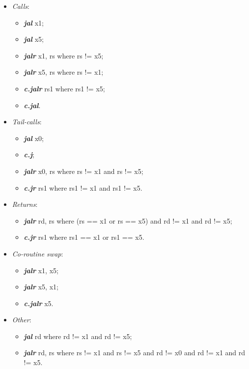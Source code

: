 \begin{itemize}
  \item \textit{Calls}: 
    \begin{itemize}
      \item \textbf{\textit{jal}} x1;
      \item \textbf{\textit{jal}} x5;
      \item \textbf{\textit{jalr}} x1, rs  where rs != x5;
      \item \textbf{\textit{jalr}} x5, rs  where rs != x1;
      \item \textbf{\textit{c.jalr}} rs1 where rs1 != x5;
      \item \textbf{\textit{c.jal}}.
    \end{itemize}
  \item \textit{Tail-calls}: 
    \begin{itemize}
      \item \textbf{\textit{jal}} x0;
      \item \textbf{\textit{c.j}};
      \item \textbf{\textit{jalr}} x0, rs where rs != x1 and rs != x5;
      \item \textbf{\textit{c.jr}} rs1 where rs1 != x1 and rs1 != x5.
    \end{itemize}
  \item \textit{Returns}: 
    \begin{itemize}
      \item \textbf{\textit{jalr}} rd, rs where (rs == x1 or rs == x5) and rd != x1 and rd != x5;
      \item \textbf{\textit{c.jr}} rs1 where rs1 == x1 or rs1 == x5.
    \end{itemize}
  \item \textit{Co-routine swap}: 
    \begin{itemize}
      \item \textbf{\textit{jalr}} x1, x5;
      \item \textbf{\textit{jalr}} x5, x1;
      \item \textbf{\textit{c.jalr}} x5.
    \end{itemize}
  \item \textit{Other}: 
    \begin{itemize}
      \item \textbf{\textit{jal}} rd where rd != x1 and rd != x5;
      \item \textbf{\textit{jalr}} rd, rs where rs != x1 and rs != x5 and rd != x0 and rd != x1 and rd != x5.
    \end{itemize}
\end{itemize}

